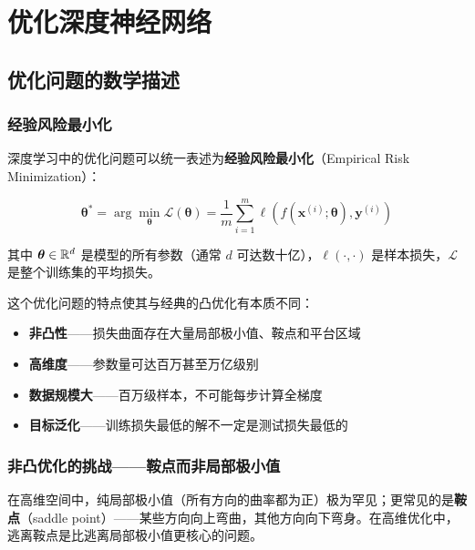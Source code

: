 
\chapter{优化深度神经网络}


\section{优化问题的数学描述}

\subsection{经验风险最小化}

深度学习中的优化问题可以统一表述为\textbf{经验风险最小化}（Empirical Risk Minimization）：

\[
\boldsymbol{\theta}^* = \arg\min_{\boldsymbol{\theta}} \mathcal{L}(\boldsymbol{\theta}) = \frac{1}{m}\sum_{i=1}^{m} \ell(f(\mathbf{x}^{(i)}; \boldsymbol{\theta}), \mathbf{y}^{(i)})
\]

其中 $\boldsymbol{\theta} \in \mathbb{R}^{d}$ 是模型的所有参数（通常 $d$ 可达数十亿），$\ell(\cdot, \cdot)$ 是样本损失，$\mathcal{L}$ 是整个训练集的平均损失。

这个优化问题的特点使其与经典的凸优化有本质不同：
\begin{itemize}
    \item \textbf{非凸性}——损失曲面存在大量局部极小值、鞍点和平台区域
    \item \textbf{高维度}——参数量可达百万甚至万亿级别
    \item \textbf{数据规模大}——百万级样本，不可能每步计算全梯度
    \item \textbf{目标泛化}——训练损失最低的解不一定是测试损失最低的
\end{itemize}

\subsection{非凸优化的挑战——鞍点而非局部极小值}

在高维空间中，纯局部极小值（所有方向的曲率都为正）极为罕见；更常见的是\textbf{鞍点}（saddle point）——某些方向向上弯曲，其他方向向下弯身。在高维优化中，逃离鞍点是比逃离局部极小值更核心的问题。


